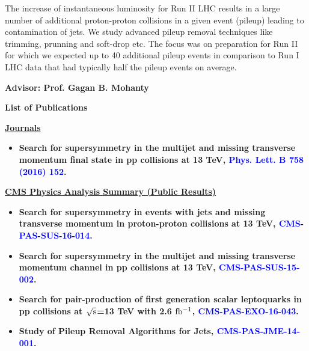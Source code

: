\begin{titlepage}
The increase of instantaneous luminosity for Run II LHC results in a large number of additional proton-proton collisions in a given event (pileup) leading to contamination of jets. We study advanced pileup removal techniques like trimming, prunning and soft-drop  etc. The focus was on preparation for Run II for which we expected up to 40 additional pileup events in comparison to Run I LHC data that had typically half the pileup events on average.



\vspace{1cm}

\begin{center}
{\bf Advisor: Prof. Gagan B. Mohanty}
\end{center}


\newpage

\bf{\LARGE List of Publications}

\vspace{2cm}
\underline{\bf \Large{Journals}}

\begin{itemize}

\item {\bf  Search for supersymmetry in the multijet and missing transverse momentum final state in pp collisions at 13 TeV, \textcolor{blue}{Phys. Lett. B 758 (2016) 152}.}

\end{itemize}
\vspace{0.5cm}
\underline{\bf \Large{CMS Physics Analysis Summary (Public Results)}}

\begin{itemize}
\item {\bf Search for supersymmetry in events with jets and missing
transverse momentum in proton-proton collisions at 13 TeV, \textcolor{blue}{CMS-PAS-SUS-16-014}.}

\item{\bf Search for supersymmetry in the multijet and missing transverse momentum channel in pp collisions at 13 TeV, \textcolor{blue}{CMS-PAS-SUS-15-002}. }

\item{\bf Search for pair-production of first generation scalar leptoquarks in pp collisions at $\rm \sqrt{s}$=13 TeV with 2.6 $\rm fb^{-1}$, \textcolor{blue}{CMS-PAS-EXO-16-043}. }

\item{\bf Study of Pileup Removal Algorithms for Jets, \textcolor{blue}{CMS-PAS-JME-14-001}.}


\end{itemize}
\end{titlepage}
